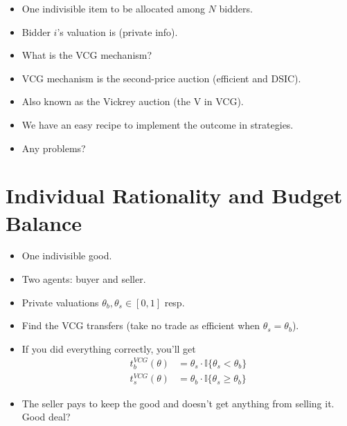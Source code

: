\documentclass[english,handout]{beamer}		%
\def\lyxframeend{} %
\begin{document}
\begin{example}[Auction]
	\begin{itemize}
		\item One indivisible item to be allocated among $N$ bidders.
		\item Bidder $i$'s valuation is  (private info).
		\item What is the VCG mechanism?
	\end{itemize}
\end{example}
\pause
\begin{itemize}
	\item VCG mechanism is the second-price auction (efficient and DSIC).
	\item Also known as the Vickrey auction (the V in VCG).
\end{itemize}
\lyxframeend


\begin{itemize}
	\item We have an easy recipe to implement the  outcome in  strategies.
	\item Any problems?
\end{itemize}
\lyxframeend



\section{Individual Rationality and Budget Balance}

\begin{example}
	\begin{itemize}
		\item One indivisible good.
		\item Two agents: buyer and seller. 
		\item Private valuations $\theta_b,\theta_s \in [0,1]$ resp.
		\item Find the VCG transfers (take no trade as efficient when $\theta_s = \theta_b$).
	\end{itemize}
\end{example}
\lyxframeend


\begin{itemize}
	\item If you did everything correctly, you'll get
	\vspace{-0.5em}\begin{align*}
	t_b^{VCG}(\theta) &= \theta_s \cdot \mathbb{I} \{ \theta_s < \theta_b \} 
	\\ t_s^{VCG}(\theta) &= \theta_b \cdot \mathbb{I} \{ \theta_s \geq \theta_b \} 
	\end{align*}\vspace{-1em}
	\pause
	\item The seller pays to keep the good and doesn't get anything from selling it. Good deal?
\end{itemize}
\lyxframeend
\end{document}
